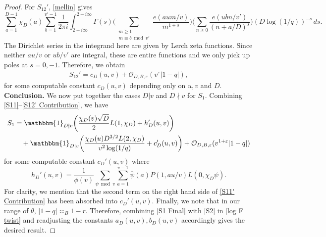 \documentclass[11pt]{amsart}
\numberwithin{equation}{section}
\newcommand{\ol}{\overline}
\newcommand{\m}{\mathrm{m}}
\theoremstyle{remark}
\begin{document}
\begin{proof}
For $S_{12}'$, \eqref{mellin} gives 
\[
\sum_{a=1}^{D-1}\chi_D(a)\sum_{b=1}^{v'-1}
\frac{1}{2\pi i }\int_{2-i\infty}^{2+i\infty}
\Gamma(s)\bigg(\sum_{\substack{m\geq 1\\m\equiv b \bmod v'}}\frac{e(aum/v)}{m^{1+s}}\bigg)\bigg(\sum_{n\geq 0}\frac{e(ubn/v')}{(n+a/D)^s}\bigg)(D\log(1/q))^{-s}\, ds.
\]
The Dirichlet series in the integrand here are given by Lerch zeta functions. Since neither $au/v$ or $ub/v'$ are integral, these are entire functions and we only pick up poles at $s=0,-1$. Therefore, we obtain
\begin{align}
\label{S12' Contribution}
S_{12}' = c_D(u,v) +\mathcal{O}_{D,B, \varepsilon}(v^{\varepsilon} \lvert 1-q \rvert),
\end{align}
for some computable constant $c_D(u,v)$ depending only on $u,v$ and $D$.\\

\noindent \textbf{Conclusion.} We now put together the cases $D|v$ and $D\nmid v$ for $S_1$. Combining \eqref{S11}--\eqref{S12' Contribution}, we have
\begin{align}\label{S1 Final}
S_1
&=
  \mathbbm{1}_{D\nmid v} \bigg(\frac{ \chi_D(v)\sqrt{D}}{2}L(1,\chi_D)+h_D'(u,v)\bigg)
\notag \\
&\quad +
\mathbbm{1}_{D|v}\bigg(\frac{\chi_D(u)D^{3/2}L(2,\chi_D)}{v^2\log(1/q)}+c_D'(u,v)\bigg)+\mathcal{O}_{D,B, \varepsilon}(v^{1+\varepsilon}|1-q|)
\end{align}
for some computable constant $c_D'(u,v)$ where 
\[
h_D'(u,v)
=
\frac{1}{\phi(v)}\sum_{\psi \bmod v}\sum_{a=1}^{v-1} 
{\ol{\psi}(a)}P(1,au/v)L(0,\chi_D\psi).
\] 
For clarity, we mention that the second term on the right hand side of \eqref{S11' Contribution} has been absorbed into $c_D'(u,v)$. Finally, we note that in our range of $\theta$, $\lvert 1-q \rvert \asymp_B 1-r.$ Therefore, combining \eqref{S1 Final} with \eqref{S2} in \eqref{log F twist} and readjusting the constants $a_D(u,v),b_D(u,v)$ accordingly gives the desired result.
\end{proof}
\end{document}
